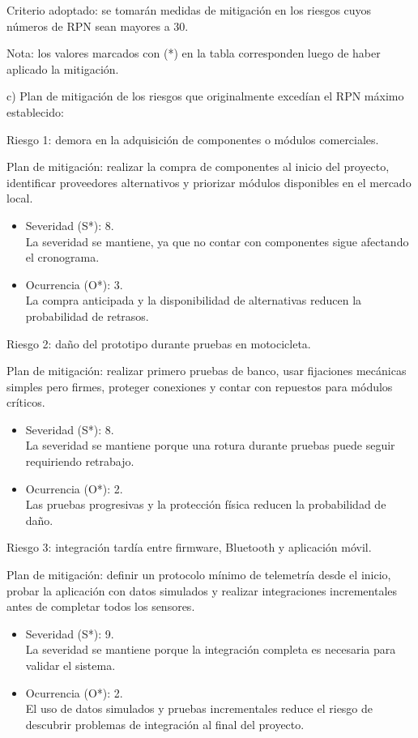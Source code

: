 \documentclass[
11pt, %
]{charter}
\begin{document}
Criterio adoptado: se tomarán medidas de mitigación en los riesgos cuyos números de RPN sean mayores a 30.

Nota: los valores marcados con (*) en la tabla corresponden luego de haber aplicado la mitigación.

c) Plan de mitigación de los riesgos que originalmente excedían el RPN máximo establecido:

Riesgo 1: demora en la adquisición de componentes o módulos comerciales.

Plan de mitigación: realizar la compra de componentes al inicio del proyecto, identificar proveedores alternativos y priorizar módulos disponibles en el mercado local.
\begin{itemize}
	\item Severidad (S*): 8.\\
	La severidad se mantiene, ya que no contar con componentes sigue afectando el cronograma.
	\item Ocurrencia (O*): 3.\\
	La compra anticipada y la disponibilidad de alternativas reducen la probabilidad de retrasos.
\end{itemize}

Riesgo 2: daño del prototipo durante pruebas en motocicleta.

Plan de mitigación: realizar primero pruebas de banco, usar fijaciones mecánicas simples pero firmes, proteger conexiones y contar con repuestos para módulos críticos.
\begin{itemize}
	\item Severidad (S*): 8.\\
	La severidad se mantiene porque una rotura durante pruebas puede seguir requiriendo retrabajo.
	\item Ocurrencia (O*): 2.\\
	Las pruebas progresivas y la protección física reducen la probabilidad de daño.
\end{itemize}

Riesgo 3: integración tardía entre firmware, Bluetooth y aplicación móvil.

Plan de mitigación: definir un protocolo mínimo de telemetría desde el inicio, probar la aplicación con datos simulados y realizar integraciones incrementales antes de completar todos los sensores.
\begin{itemize}
	\item Severidad (S*): 9.\\
	La severidad se mantiene porque la integración completa es necesaria para validar el sistema.
	\item Ocurrencia (O*): 2.\\
	El uso de datos simulados y pruebas incrementales reduce el riesgo de descubrir problemas de integración al final del proyecto.
\end{itemize}
\end{document}
